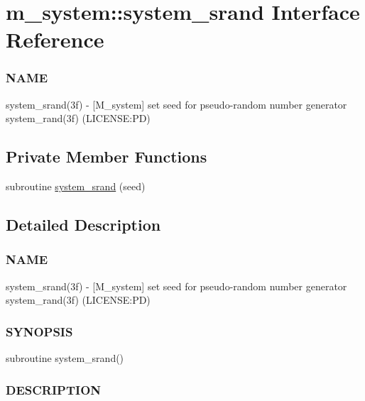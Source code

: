 \hypertarget{interfacem__system_1_1system__srand}{}\section{m\+\_\+system\+:\+:system\+\_\+srand Interface Reference}
\label{interfacem__system_1_1system__srand}


\subsubsection*{N\+A\+ME}

system\+\_\+srand(3f) -\/ \mbox{[}M\+\_\+system\mbox{]} set seed for pseudo-\/random number generator system\+\_\+rand(3f) (L\+I\+C\+E\+N\+SE\+:PD)  


\subsection*{Private Member Functions}
\begin{DoxyCompactItemize}
\item 
subroutine \mbox{\hyperlink{interfacem__system_1_1system__srand_ade7bd32973cd799f1362cec842bef377}{system\+\_\+srand}} (seed)
\end{DoxyCompactItemize}


\subsection{Detailed Description}
\subsubsection*{N\+A\+ME}

system\+\_\+srand(3f) -\/ \mbox{[}M\+\_\+system\mbox{]} set seed for pseudo-\/random number generator system\+\_\+rand(3f) (L\+I\+C\+E\+N\+SE\+:PD) 

\subsubsection*{S\+Y\+N\+O\+P\+S\+IS}

\begin{DoxyVerb}subroutine system_srand()
\end{DoxyVerb}


\subsubsection*{D\+E\+S\+C\+R\+I\+P\+T\+I\+ON}

